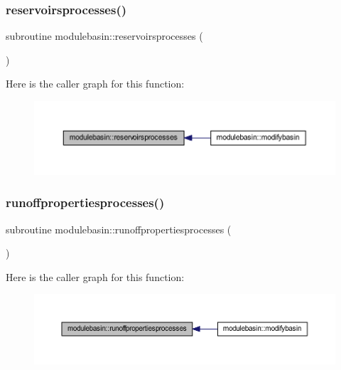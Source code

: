 \subsubsection{\texorpdfstring{reservoirsprocesses()}{reservoirsprocesses()}}
{\footnotesize\ttfamily subroutine modulebasin\+::reservoirsprocesses (\begin{DoxyParamCaption}{ }\end{DoxyParamCaption})\hspace{0.3cm}{\ttfamily [private]}}

Here is the caller graph for this function\+:\nopagebreak
\begin{figure}[H]
\begin{center}
\leavevmode
\includegraphics[width=350pt]{namespacemodulebasin_a2d6933b0b62fd8ddf365de6af6309c1c_icgraph}
\end{center}
\end{figure}
\mbox{\label{namespacemodulebasin_a0d5f24ad034e1da333cb8086aba4bf1f}} 
\subsubsection{\texorpdfstring{runoffpropertiesprocesses()}{runoffpropertiesprocesses()}}
{\footnotesize\ttfamily subroutine modulebasin\+::runoffpropertiesprocesses (\begin{DoxyParamCaption}{ }\end{DoxyParamCaption})\hspace{0.3cm}{\ttfamily [private]}}

Here is the caller graph for this function\+:\nopagebreak
\begin{figure}[H]
\begin{center}
\leavevmode
\includegraphics[width=350pt]{namespacemodulebasin_a0d5f24ad034e1da333cb8086aba4bf1f_icgraph}
\end{center}
\end{figure}
\mbox{\label{namespacemodulebasin_aa0b9eaedf50e780116499db9c0c35730}} 
